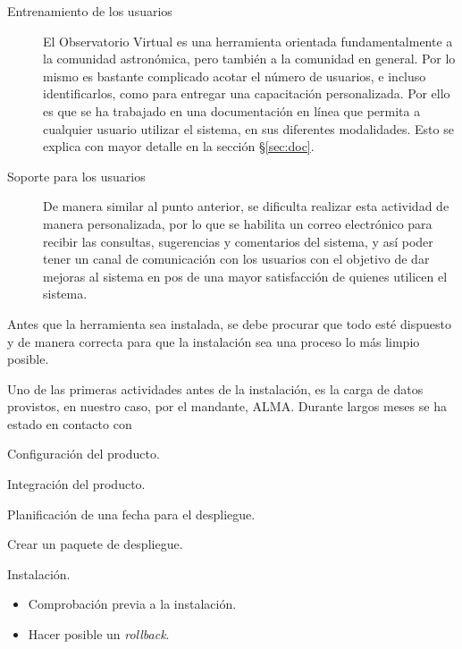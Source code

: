 \begin{description}
\begin{description}
			\item [Entrenamiento de los usuarios] El Observatorio Virtual es una herramienta orientada fundamentalmente a la comunidad astronómica, pero tambi\'en a la comunidad en general. Por lo mismo es bastante complicado acotar el número de usuarios, e incluso identificarlos, como para entregar una capacitación personalizada. Por ello es que se ha trabajado en una documentación en línea que permita a cualquier usuario utilizar el sistema, en sus diferentes modalidades. Esto se explica con mayor detalle en la sección \S\ref{sec:doc}.
			\item [Soporte para los usuarios] De manera similar al punto anterior, se dificulta realizar esta actividad de manera personalizada, por lo que se habilita un correo electrónico\footnotemark{} para recibir las consultas, sugerencias y comentarios del sistema, y así poder tener un canal de comunicación con los usuarios con el objetivo de dar mejoras al sistema en pos de una mayor satisfacción de quienes utilicen el sistema.
		\end{description}
	\item [Preparaciones para la instalación] Antes que la herramienta sea instalada, se debe procurar que todo est\'e dispuesto y de manera correcta para que la instalación sea una proceso lo más limpio posible.
		\begin{description}
			\item [Importanción inicial de los datos iniciales del cliente] Uno de las primeras actividades antes de la instalación, es la carga de datos provistos, en nuestro caso, por el mandante, ALMA. Durante largos meses se ha estado en contacto con
			\item Configuración del producto.
			\item Integración del producto.
			\item Planificación de una fecha para el despliegue.
			\item Crear un paquete de despliegue.
		\end{description}
	\item Instalación.
		\begin{itemize}
			\item Comprobación previa a la instalación.
			\item Hacer posible un \emph{rollback}.

\end{itemize}
\end{description}
